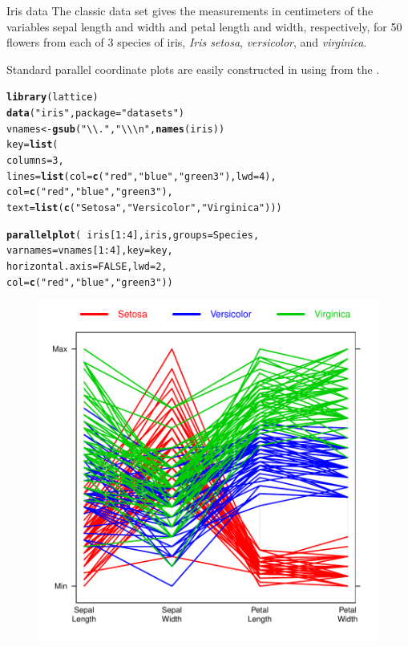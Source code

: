 \documentclass[11pt]{book}\usepackage[]{graphicx}\usepackage[]{color}
\makeatletter
\newcommand{\hlnum}[1]{\textcolor[rgb]{0.686,0.059,0.569}{#1}}%
\newcommand{\hlstr}[1]{\textcolor[rgb]{0.192,0.494,0.8}{#1}}%
\newcommand{\hlopt}[1]{\textcolor[rgb]{0,0,0}{#1}}%
\newcommand{\hlstd}[1]{\textcolor[rgb]{0.345,0.345,0.345}{#1}}%
\newcommand{\hlkwb}[1]{\textcolor[rgb]{0.69,0.353,0.396}{#1}}%
\newcommand{\hlkwc}[1]{\textcolor[rgb]{0.333,0.667,0.333}{#1}}%
\newcommand{\hlkwd}[1]{\textcolor[rgb]{0.737,0.353,0.396}{\textbf{#1}}}%
\newenvironment{kframe}{%
 \def\at@end@of@kframe{}%
 \ifinner\ifhmode%
  \def\at@end@of@kframe{\end{minipage}}%
  \begin{minipage}{\columnwidth}%
 \fi\fi%
 \def\FrameCommand##1{\hskip\@totalleftmargin \hskip-\fboxsep
 \colorbox{shadecolor}{##1}\hskip-\fboxsep
     \hskip-\linewidth \hskip-\@totalleftmargin \hskip\columnwidth}%
 \MakeFramed {\advance\hsize-\width
   \@totalleftmargin\z@ \linewidth\hsize
   \@setminipage}}%
 {\par\unskip\endMakeFramed%
 \at@end@of@kframe}
\newenvironment{knitrout}{}{} %
\renewenvironment{knitrout}{\small\renewcommand{\baselinestretch}{.85}}{} %
\makeatother
\begin{document}
\begin{Example}[iris1]{Iris data}
The classic  data set \citep{Anderson:35,Fisher:36}
gives the measurements in centimeters of the variables sepal length and width and petal length and width, respectively, for 50 flowers from each of 3 species of iris, \emph{Iris setosa}, \emph{versicolor}, and \emph{virginica}. 

Standard parallel coordinate plots are easily constructed in \R using
 from the .
\begin{knitrout}
\color{fgcolor}\begin{kframe}
\begin{alltt}
\hlkwd{library}\hlstd{(lattice)}
\hlkwd{data}\hlstd{(}\hlstr{"iris"}\hlstd{,} \hlkwc{package}\hlstd{=}\hlstr{"datasets"}\hlstd{)}
\hlstd{vnames} \hlkwb{<-} \hlkwd{gsub}\hlstd{(}\hlstr{"\textbackslash{}\textbackslash{}."}\hlstd{,} \hlstr{"\textbackslash{}\textbackslash{}\textbackslash{}n"}\hlstd{,} \hlkwd{names}\hlstd{(iris))}
\hlstd{key} \hlkwb{=} \hlkwd{list}\hlstd{(}
         \hlkwc{columns} \hlstd{=} \hlnum{3}\hlstd{,}
         \hlkwc{lines} \hlstd{=} \hlkwd{list}\hlstd{(}\hlkwc{col}\hlstd{=}\hlkwd{c}\hlstd{(}\hlstr{"red"}\hlstd{,} \hlstr{"blue"}\hlstd{,} \hlstr{"green3"}\hlstd{),} \hlkwc{lwd}\hlstd{=}\hlnum{4}\hlstd{),}
         \hlkwc{col}\hlstd{=}\hlkwd{c}\hlstd{(}\hlstr{"red"}\hlstd{,} \hlstr{"blue"}\hlstd{,} \hlstr{"green3"}\hlstd{),}
         \hlkwc{text} \hlstd{=} \hlkwd{list}\hlstd{(}\hlkwd{c}\hlstd{(}\hlstr{"Setosa"}\hlstd{,} \hlstr{"Versicolor"}\hlstd{,} \hlstr{"Virginica"}\hlstd{)))}

\hlkwd{parallelplot}\hlstd{(}\hlopt{~}\hlstd{iris[}\hlnum{1}\hlopt{:}\hlnum{4}\hlstd{], iris,} \hlkwc{groups} \hlstd{= Species,}
  \hlkwc{varnames} \hlstd{= vnames[}\hlnum{1}\hlopt{:}\hlnum{4}\hlstd{],} \hlkwc{key}\hlstd{=key,}
  \hlkwc{horizontal.axis} \hlstd{=} \hlnum{FALSE}\hlstd{,} \hlkwc{lwd}\hlstd{=}\hlnum{2}\hlstd{,}
  \hlkwc{col}\hlstd{=}\hlkwd{c}\hlstd{(}\hlstr{"red"}\hlstd{,} \hlstr{"blue"}\hlstd{,} \hlstr{"green3"}\hlstd{))}
\end{alltt}
\end{kframe}\begin{figure}[htbp]


\centerline{\includegraphics[width=.6\textwidth]{ch05/fig/iris1} }


\end{figure}
\end{knitrout}
\end{Example}
\end{document}
